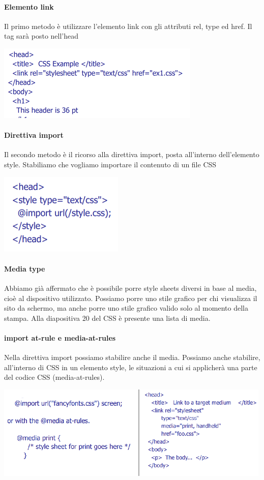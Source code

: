 \documentclass[11pt]{report}
\begin{document}
\paragraph{Elemento link} Il primo metodo è utilizzare l'elemento link con gli attributi rel, type ed href. Il tag sarà posto nell'head
\begin{center}
\includegraphics{img/4.PNG}
\end{center}
\paragraph{Direttiva import} Il secondo metodo è il ricorso alla direttiva import, posta all'interno dell'elemento style. Stabiliamo che vogliamo importare il contenuto di un file CSS
\begin{center}
\includegraphics{img/5.PNG}
\end{center}
\paragraph{Media type} Abbiamo già affermato che è possibile porre style sheets diversi in base al media, cioè al dispositivo utilizzato. Possiamo porre uno stile grafico per chi visualizza il sito da schermo, ma anche porre uno stile grafico valido solo al momento della stampa. Alla diapositiva 20 del CSS è presente una lista di media.
\paragraph{import at-rule e media-at-rules} Nella direttiva import possiamo stabilire anche il media. Possiamo anche stabilire, all'interno di CSS in un elemento style, le situazioni a cui si applicherà una parte del codice CSS (media-at-rules).
\begin{center}
\includegraphics{img/6.PNG}
\end{center}
\end{document}

